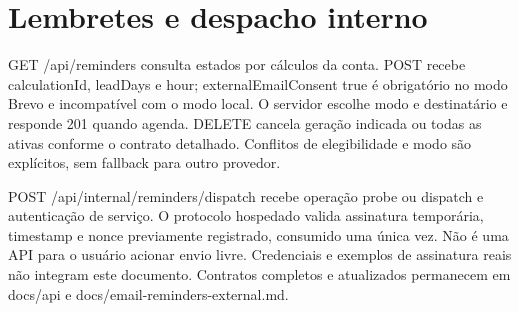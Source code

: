 \section{Lembretes e despacho interno}
\label{section-C-3}
GET /api/reminders consulta estados por cálculos da conta. POST recebe calculationId, leadDays e hour; externalEmailConsent true é obrigatório no modo Brevo e incompatível com o modo local. O servidor escolhe modo e destinatário e responde 201 quando agenda. DELETE cancela geração indicada ou todas as ativas conforme o contrato detalhado. Conflitos de elegibilidade e modo são explícitos, sem fallback para outro provedor.

POST /api/internal/reminders/dispatch recebe operação probe ou dispatch e autenticação de serviço. O protocolo hospedado valida assinatura temporária, timestamp e nonce previamente registrado, consumido uma única vez. Não é uma API para o usuário acionar envio livre. Credenciais e exemplos de assinatura reais não integram este documento. Contratos completos e atualizados permanecem em docs/api e docs/email-reminders-external.md.
